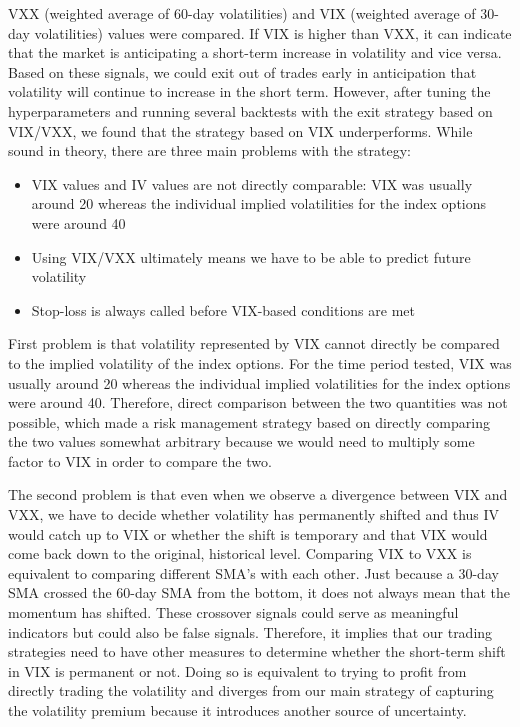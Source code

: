\documentclass[10pt]{article}
\theoremstyle{definition}
\begin{document}
VXX (weighted average of 60-day volatilities) and VIX (weighted average of 30-day volatilities) values were compared. If VIX is higher than VXX, it can indicate that the market is anticipating a short-term increase in volatility and vice versa. Based on these signals, we could exit out of trades early in anticipation that volatility will continue to increase in the short term. However, after tuning the hyperparameters and running several backtests with the exit strategy based on VIX/VXX, we found that the strategy based on VIX underperforms. While sound in theory, there are three main problems with the strategy:
\begin{itemize}
	\item VIX values and IV values are not directly comparable: VIX was usually around 20 whereas the individual implied volatilities for the index options were around 40
	\item Using VIX/VXX ultimately means we have to be able to predict future volatility
        \item Stop-loss is always called before VIX-based conditions are met
\end{itemize}

First problem is that volatility represented by VIX cannot directly be compared to the implied volatility of the index options. For the time period tested, VIX was usually around 20 whereas the individual implied volatilities for the index options were around 40. Therefore, direct comparison between the two quantities was not possible, which made a risk management strategy based on directly comparing the two values somewhat arbitrary because we would need to multiply some factor to VIX in order to compare the two.

The second problem is that even when we observe a divergence between VIX and VXX, we have to decide whether volatility has permanently shifted and thus IV would catch up to VIX or whether the shift is temporary and that VIX would come back down to the original, historical level. Comparing VIX to VXX is equivalent to comparing different SMA's with each other. Just because a 30-day SMA crossed the 60-day SMA from the bottom, it does not always mean that the momentum has shifted. These crossover signals could serve as meaningful indicators but could also be false signals. Therefore, it implies that our trading strategies need to have other measures to determine whether the short-term shift in VIX is permanent or not. Doing so is equivalent to trying to profit from directly trading the volatility and diverges from our main strategy of capturing the volatility premium because it introduces another source of uncertainty.
\end{document}
